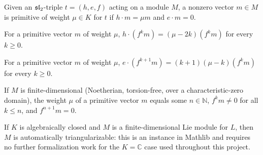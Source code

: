 \begin{definition}
  \label{def:sl2-primitive}
  \mathlibok
  Given an $\mathfrak{sl}_2$-triple $t = (h,e,f)$ acting on a module $M$, a nonzero
  vector $m \in M$ is primitive of weight $\mu \in K$ for $t$ if
  $h \cdot m = \mu m$ and $e \cdot m = 0$.
\end{definition}

\begin{theorem}
  \label{thm:sl2-string-h}
  \mathlibok
  For a primitive vector $m$ of weight $\mu$, $h \cdot (f^k m) = (\mu - 2k)(f^k m)$
  for every $k \ge 0$.
\end{theorem}

\begin{theorem}
  \label{thm:sl2-string-e}
  \mathlibok
  For a primitive vector $m$ of weight $\mu$,
  $e \cdot (f^{k+1} m) = (k+1)(\mu - k)(f^k m)$ for every $k \ge 0$.
\end{theorem}

\begin{theorem}
  \label{thm:sl2-string-finite}
  \mathlibok
  If $M$ is finite-dimensional (Noetherian, torsion-free, over a
  characteristic-zero domain), the weight $\mu$ of a primitive vector $m$
  equals some $n \in \mathbb{N}$, $f^k m \neq 0$ for all $k \le n$, and
  $f^{n+1} m = 0$.
\end{theorem}

\begin{theorem}
  \label{thm:sl2-triangularizable}
  \mathlibok
  If $K$ is algebraically closed and $M$ is a finite-dimensional Lie module
  for $L$, then $M$ is automatically triangularizable: this is an instance in
  Mathlib and requires no further formalization work for the $K = \mathbb{C}$
  case used throughout this project.
\end{theorem}

